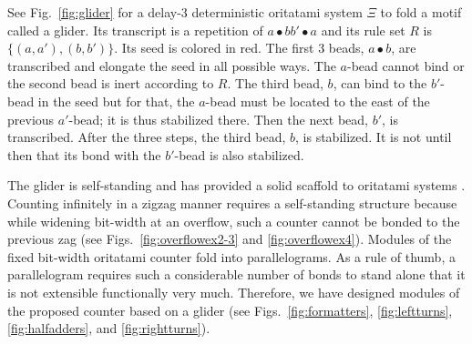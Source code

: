 \documentclass[twocolumn]{svjour3}
\begin{document}
\begin{example}
	See Fig.~\ref{fig:glider} for a delay-3 deterministic oritatami system $\Xi$ to fold a motif called a glider. 
	Its transcript is a repetition of $a \bullet b b' \bullet a$ and its rule set $R$ is $\{(a, a'), (b, b')\}$. 
	Its seed is colored in red. 
	The first 3 beads, $a \bullet b$, are transcribed and elongate the seed in all possible ways. 
	The $a$-bead cannot bind or the second bead is inert according to $R$. 
	The third bead, $b$, can bind to the $b'$-bead in the seed but for that, the $a$-bead must be located to the east of the previous $a'$-bead; it is thus stabilized there. 
	Then the next bead, $b'$, is transcribed. 
	After the three steps, the third bead, $b$, is stabilized. 
	It is not until then that its bond with the $b'$-bead is also stabilized. 
	
	The glider is self-standing and has provided a solid scaffold to oritatami systems \cite{DemaineHOPRSST2018,ElonenBachelor2016,GeMeScSe2018,HanKim2018,PchelinaSSU2020}. 
	Counting infinitely in a zigzag manner requires a self-standing structure because while widening bit-width at an overflow, such a counter cannot be bonded to the previous zag (see Figs.~\ref{fig:overflowex2-3} and \ref{fig:overflowex4}).  
	Modules of the fixed bit-width oritatami counter fold into parallelograms. 
	As a rule of thumb, a parallelogram requires such a considerable number of bonds to stand alone that it is not extensible functionally very much. 
	Therefore, we have designed modules of the proposed counter based on a glider (see Figs.~\ref{fig:formatters}, \ref{fig:leftturns}, \ref{fig:halfadders}, and \ref{fig:rightturns}). 
\end{example}




\end{document}
